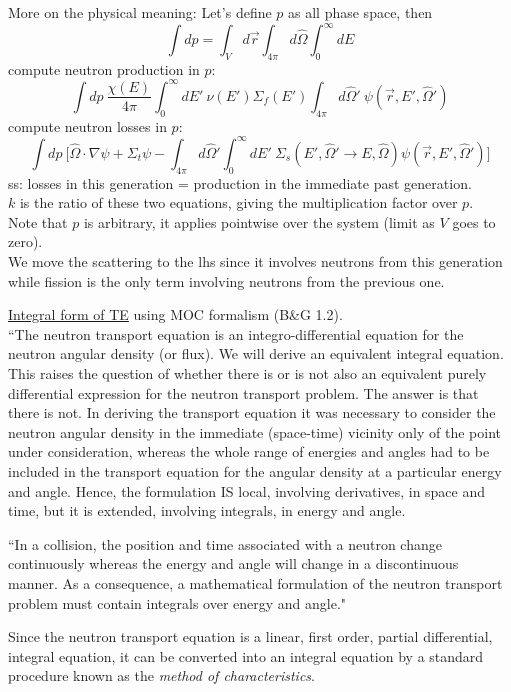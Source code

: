 \documentclass[12pt]{article}
\newcommand{\rvec}{\ensuremath{\vec{r}}}
\newcommand{\vOmega}{\ensuremath{\hat{\Omega}}}
\begin{document}
More on the physical meaning: Let's define $p$ as all phase space, then
  \[\int dp = \int_{V} d\rvec \int_{4 \pi} d\vOmega \int_0^{\infty} dE\]
compute neutron production in $p$:
  \[\int dp\:\frac{\chi(E)}{4 \pi}\int_0^{\infty} dE' \: \nu(E') \Sigma_f(E') \int_{4 \pi} d\vOmega' \:\psi(\vec{r}, E', \vOmega') \]
compute neutron losses in $p$:
  \[\int dp\:\biggl[\vOmega \cdot \nabla \psi + \Sigma_t \psi - \int_{4 \pi} d\vOmega' \int_0^{\infty} dE' \: \Sigma_s(E', \vOmega' \rightarrow E, \vOmega) \psi(\vec{r}, E', \vOmega') \biggr] \]
ss: losses in this generation = production in the immediate past generation.\\
$k$ is the ratio of these two equations, giving the multiplication factor over $p$.\\
Note that $p$ is arbitrary, it applies pointwise over the system (limit as $V$ goes to zero).\\
We move the scattering to the lhs since it involves neutrons from this generation while fission is the only term involving neutrons from the previous one.


\clearpage
\underline{Integral form of TE} using MOC formalism (B\&G 1.2).\\
``The neutron transport equation is an integro-differential equation for the
neutron angular density (or flux). We will derive an equivalent integral equation. This raises the question of whether there is or is not also an
equivalent purely differential expression for the neutron transport problem.
The answer is that there is not. In deriving the transport
equation it was necessary to consider the neutron angular density in the 
immediate (space-time) vicinity only of the point under consideration, whereas the
whole range of energies and angles had to be included in the transport equation
for the angular density at a particular energy and angle. Hence, the formulation
IS local, involving derivatives, in space and time, but it is extended, involving
integrals, in energy and angle.

``In a collision, the position
and time associated with a neutron change continuously whereas the energy and
angle will change in a discontinuous manner. As a consequence, a mathematical
formulation of the neutron transport problem must contain integrals over energy
and angle."

Since the neutron transport equation is a linear, first order, partial differential,
integral equation, it can be converted into an integral equation by a standard
procedure known as the \textit{method of characteristics}.
\end{document}
